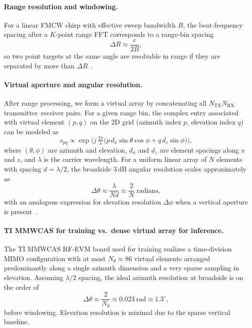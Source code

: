 \paragraph{Range resolution and windowing.}
For a linear FMCW chirp with effective sweep bandwidth $B$, the
beat-frequency spacing after a $K$-point range FFT corresponds to a
range-bin spacing
\begin{equation}
    \Delta R \approx \frac{c}{2B},
\end{equation}
so two point targets at the same angle are resolvable in range if they
are separated by more than $\Delta R$~\cite{9658500}. 

\paragraph{Virtual aperture and angular resolution.}
After range processing, we form a virtual array by concatenating all
$N_\text{TX} N_\text{RX}$ transmitter–receiver pairs. For a given range
bin, the complex entry associated with virtual element $(p,q)$ on the
2D grid (azimuth index $p$, elevation index $q$) can be modeled as
\begin{equation}
    s_{pq} \propto 
    \exp\!\Big(
        j \, \tfrac{2\pi}{\lambda} 
        \big( p\,d_x \sin\theta \cos\phi + q\,d_z \sin\phi \big)
    \Big),
\end{equation}
where $(\theta,\phi)$ are azimuth and elevation, $d_x$ and $d_z$ are
element spacings along $x$ and $z$, and $\lambda$ is the carrier
wavelength. For a uniform linear array of $N$ elements with spacing
$d=\lambda/2$, the broadside 3\,dB angular resolution scales
approximately as
\begin{equation}
    \Delta \theta \approx \frac{\lambda}{N d}
    \approx \frac{2}{N} \;\text{radians},
\end{equation}
with an analogous expression for elevation resolution $\Delta\phi$ when
a vertical aperture is present~\cite{9658500}.

\paragraph{TI MMWCAS for training vs.\ dense virtual array for inference.}
The TI MMWCAS RF-EVM board used for training realizes a time-division
MIMO configuration with at most $N_\theta \approx 86$ virtual
elements arranged predominantly along a single azimuth dimension and a
very sparse sampling in elevation. Assuming $\lambda/2$ spacing, the
ideal azimuth resolution at broadside is on the order of
\begin{equation}
    \Delta \theta \approx \frac{2}{N_\theta}
    \approx 0.023~\text{rad} \approx 1.3^\circ,
\end{equation}
before windowing. Elevation resolution is minimal due to the sparse vertical baseline.

